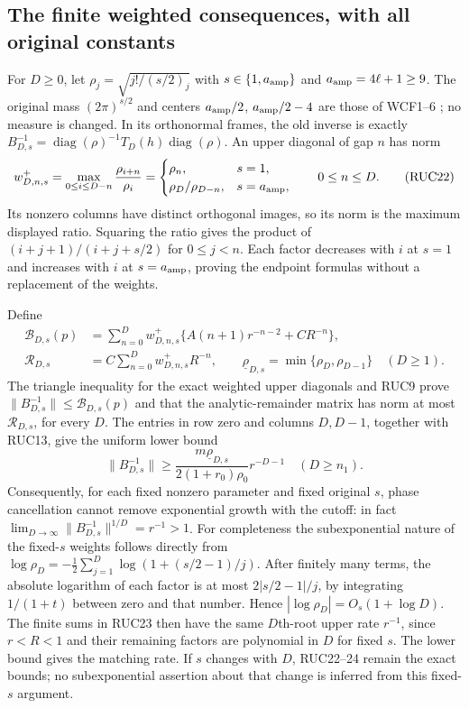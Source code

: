 \subsection{The finite weighted consequences, with all original constants}

For $D\ge0$, let $\rho_j=\sqrt{j!/(s/2)_j}$ with
$s\in\{1,a_{\rm amp}\}$ and $a_{\rm amp}=4\ell+1\ge9$.
The original mass $(2\pi)^{s/2}$ and centers
$a_{\rm amp}/2$, $a_{\rm amp}/2-4$ are those of WCF1--6
\cite{WCF}; no measure is changed.  In its orthonormal frames,
the old inverse is exactly
$B_{D,s}^{-1}=\operatorname{diag}(\rho)^{-1}T_D(h)
\operatorname{diag}(\rho)$.
An upper diagonal of gap $n$ has norm
\[
 w^+_{D,n,s}=\max_{0\le i\le D-n}\frac{\rho_{i+n}}{\rho_i}
 =\begin{cases}\rho_n,&s=1,\\
                 \rho_D/\rho_{D-n},&s=a_{\rm amp},
   \end{cases}\qquad 0\le n\le D.
 \tag{RUC22}
\]
Its nonzero columns have distinct orthogonal images, so its norm
is the maximum displayed ratio.  Squaring the ratio gives the
product of $(i+j+1)/(i+j+s/2)$ for $0\le j<n$.
Each factor decreases with $i$ at $s=1$ and increases with $i$
at $s=a_{\rm amp}$, proving the endpoint formulas without a
replacement of the weights.

Define
\[
 \begin{aligned}
 \mathcal B_{D,s}(p)&=\sum_{n=0}^D w^+_{D,n,s}
           \{A(n+1)r^{-n-2}+CR^{-n}\},\\
 \mathcal R_{D,s}&=C\sum_{n=0}^D w^+_{D,n,s}R^{-n},\qquad
 \underline\rho_{D,s}=\min\{\rho_D,\rho_{D-1}\}\quad(D\ge1).
 \end{aligned}\tag{RUC23}
\]
The triangle inequality for the exact weighted upper diagonals
and RUC9 prove $\|B_{D,s}^{-1}\|\le\mathcal B_{D,s}(p)$ and
that the analytic-remainder matrix has norm at most
$\mathcal R_{D,s}$, for every $D$.  The entries in row zero and
columns $D,D-1$, together with RUC13, give the uniform lower bound
\[
 \|B_{D,s}^{-1}\|
 \ge\frac{m\underline\rho_{D,s}}{2(1+r_0)\rho_0}
          r^{-D-1}\quad(D\ge n_1).
 \tag{RUC24}
\]
Consequently, for each fixed nonzero parameter and fixed original
$s$, phase cancellation cannot remove exponential growth with
the cutoff: in fact
$\lim_{D\to\infty}\|B_{D,s}^{-1}\|^{1/D}=r^{-1}>1$.
For completeness the subexponential nature of the fixed-$s$
weights follows directly from
$\log\rho_D=-\frac12\sum_{j=1}^D\log(1+(s/2-1)/j)$.
After finitely many terms, the absolute logarithm of each factor
is at most $2|s/2-1|/j$, by integrating $1/(1+t)$ between zero
and that number.  Hence $|\log\rho_D|=O_s(1+\log D)$.
The finite sums in RUC23 then have the same $D$th-root upper
rate $r^{-1}$, since $r<R<1$ and their remaining factors are
polynomial in $D$ for fixed $s$.  The lower bound gives the
matching rate.  If $s$ changes with $D$, RUC22--24 remain the
exact bounds; no subexponential assertion about that change is
inferred from this fixed-$s$ argument.

